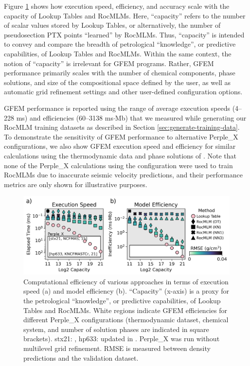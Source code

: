 \documentclass[draft,linenumbers]{agujournal2018}
\begin{document}
Figure \ref{fig:rocmlm-performance} shows how execution speed, efficiency, and accuracy scale with the capacity of Lookup Tables and RocMLMs. Here, ``capacity'' refers to the number of scalar values stored by Lookup Tables, or alternatively, the number of pseudosection PTX points ``learned'' by RocMLMs. Thus, ``capacity'' is intended to convey and compare the breadth of petrological ``knowledge'', or predictive capabilities, of Lookup Tables and RocMLMs. Within the same context, the notion of ``capacity'' is irrelevant for GFEM programs. Rather, GFEM performance primarily scales with the number of chemical components, phase solutions, and size of the compositional space defined by the user, as well as automatic grid refinement settings and other user-defined configuration options.

GFEM performance is reported using the range of average execution speeds (4--228 ms) and efficiencies (60--3138 ms\(\cdot\)Mb) that we measured while generating our RocMLM training datasets as described in Section \ref{sec:generate-training-data}. To demonstrate the sensitivity of GFEM performance to alternative Perple\_X configurations, we also show GFEM execution speed and efficiency for similar calculations using the thermodynamic data and phase solutions of \citet{holland2018}. Note that none of the Perple\_X calculations using the \citet{holland2018} configuration were used to train RocMLMs due to inaccurate seismic velocity predictions, and their performance metrics are only shown for illustrative purposes.



\begin{figure}[htbp]

{\centering \includegraphics[width=1\linewidth,]{rocmlm-performance} 

}

\caption{Computational efficiency of various approaches in terms of execution speed (a) and model efficiency (b). ``Capacity'' (x-axis) is a proxy for the petrological ``knowledge'', or predictive capabilities, of Lookup Tables and RocMLMs. White regions indicate GFEM efficiencies for different Perple\_X configurations (thermodynamic dataset, chemical system, and number of solution phases are indicated in square brackets). stx21: \citet{stixrude2022}, hp633: \citet{holland2011} updated in \citet{holland2018}. Perple\_X was run without multilevel grid refinement. RMSE is measured between density predictions and the validation dataset.}\label{fig:rocmlm-performance}
\end{figure}
\end{document}
